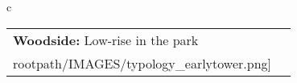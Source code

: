 \begin{table}[H]
        \begin{tabular}{c}
        \begin{tabular}{m{1.5in} m{2in}}
\textbf{Woodside:} {Low-rise in the park} & \texttt{[image: \\rootpath/IMAGES/typology\_earlytower.png]}
\end{tabular}\end{tabular}
        \end{table}